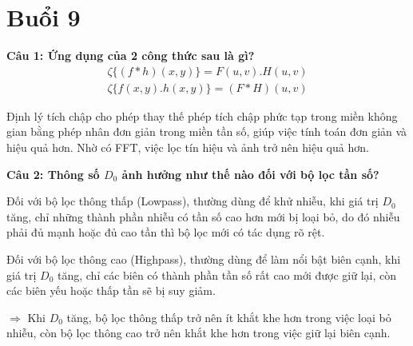 \section{Buổi 9}

\textbf{Câu 1: Ứng dụng của 2 công thức sau là gì?}
\begin{gather*}
	\zeta \{(f * h)(x, y)\} = F(u, v) . H(u, v) \\
	\zeta \{f(x, y).h(x, y)\} = (F * H)(u, v)
\end{gather*}

Định lý tích chập cho phép thay thế phép tích chập phức tạp trong miền không gian bằng phép nhân đơn giản trong miền tần số, giúp việc tính toán đơn giản và hiệu quả hơn. Nhờ có FFT, việc lọc tín hiệu và ảnh trở nên hiệu quả hơn.

\textbf{Câu 2: Thông số $D_0$ ảnh hưởng như thế nào đối với bộ lọc tần số?}

Đối với bộ lọc thông thấp (Lowpass), thường dùng để khử nhiễu, khi giá trị $D_0$ tăng, chỉ những thành phần nhiễu có tần số cao hơn mới bị loại bỏ, do đó nhiễu phải đủ mạnh hoặc đủ cao tần thì bộ lọc mới có tác dụng rõ rệt.

Đối với bộ lọc thông cao (Highpass), thường dùng để làm nổi bật biên cạnh, khi giá trị $D_0$ tăng, chỉ các biên có thành phần tần số rất cao mới được giữ lại, còn các biên yếu hoặc thấp tần sẽ bị suy giảm.

$\Rightarrow$ Khi $D_0$ tăng, bộ lọc thông thấp trở nên ít khắt khe hơn trong việc loại bỏ nhiễu, còn bộ lọc thông cao trở nên khắt khe hơn trong việc giữ lại biên cạnh.
























